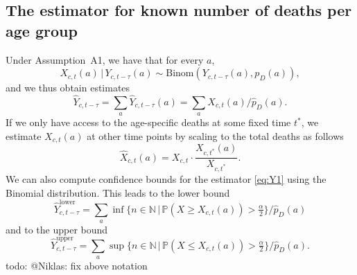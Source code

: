 \documentclass[a4paper]{article}
\newcommand\N{\mathbb{N}}
\newcommand\todo[1]{{\color{red}todo: #1}}
\renewcommand\P{\mathbb{P}}
\newcommand{\given}{\, \vert \,}
\begin{document}
\subsection{The estimator for known number of deaths per age group} \label{sec:known}
%
Under Assumption~A1, we have that for every $a$, 
$$X_{c,t}(a) \given Y_{c,t-\tau}(a) \sim \text{Binom}(Y_{c,t-\tau}(a), p_D(a)),$$
and we thus obtain estimates
\begin{equation}
  \label{eq:Y1}
  \hat{Y}_{c,t-\tau} = \sum_a \hat{Y}_{c,t-\tau}(a) =\sum_a
  X_{c,t}(a) / \hat  p_D(a).
\end{equation}
If we only have access to the age-specific deaths at some fixed time
$t^*$, we estimate $X_{c,t}(a)$ at other time points by scaling to the total deaths as follows
\begin{equation*}
  \hat{X}_{c,t}(a)=X_{c,t}\cdot\frac{X_{c,t^*}(a)}{X_{c,t^*}}.
\end{equation*}
We can also compute confidence bounds for the estimator \eqref{eq:Y1}
using the Binomial distribution. This leads to the lower bound
\begin{equation*}
  \hat{Y}_{c,t-\tau}^{\text{lower}} = \sum_a \inf\{n\in\N \,\vert\, \P(X\geq
  X_{c,t}(a))>\tfrac{\alpha}{2}\} / \hat  p_D(a)
\end{equation*}
and to the upper bound
\begin{equation*}
  \hat{Y}_{c,t-\tau}^{\text{upper}} = \sum_a \sup\{n\in\N \,\vert\, \P(X\leq
  X_{c,t}(a))>\tfrac{\alpha}{2}\} / \hat  p_D(a).
\end{equation*}
\todo{@Niklas: fix above notation}
\end{document}
